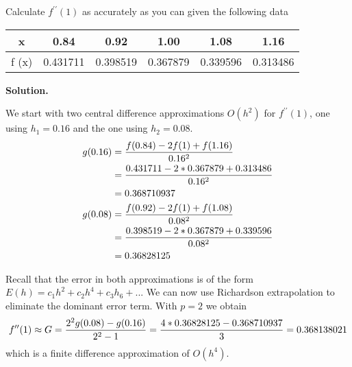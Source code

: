 \begin{exercise}{3} %
Calculate $f^{\prime \prime}(1)$ as accurately as you can given the following data
\begin{table}[h]
\centering
\begin{tabular}{|c|c|c|c|c|c|}
\hline
x &0.84& 0.92& 1.00& 1.08& 1.16\\ \hline
f (x) &0.431711 &0.398519& 0.367879& 0.339596 & 0.313486 \\ \hline
\end{tabular}
\end{table}

\textbf{Solution.}

We start with two central difference approximations $O(h^2)$ for $f^{\prime \prime}(1)$, one using $h_1=0.16$ and the one using $h_2=0.08$.
\begin{align}
g(0.16)&=\frac{f(0.84) - 2f(1)+f(1.16)}{0.16^2} \notag \\
			&=\frac{0.431711 - 2*0.367879+0.313486}{0.16^2} \notag \\
            &=0.368710937 \notag \\
g(0.08)&=\frac{f(0.92) - 2f(1)+f(1.08)}{0.08^2} \notag \\
			&=\frac{0.398519 - 2*0.367879+0.339596}{0.08^2} \notag \\
            &=0.36828125 \notag
\end{align}

Recall that the error in both approximations is of the form \(E(h) = c_1h^2 + c_2h^4+c_3h_6 +...\) We can now use Richardson extrapolation to eliminate the dominant error term. With $p = 2$ we obtain
\begin{align}
f^{\prime \prime}(1) \approx G = \frac{2^2g(0.08)-g(0.16)}{2^2-1} = \frac{4*0.36828125-0.368710937}{3}
= 0.368138021 \notag
\end{align}
which is a finite difference approximation of \(O(h^4)\).
\end{exercise}


